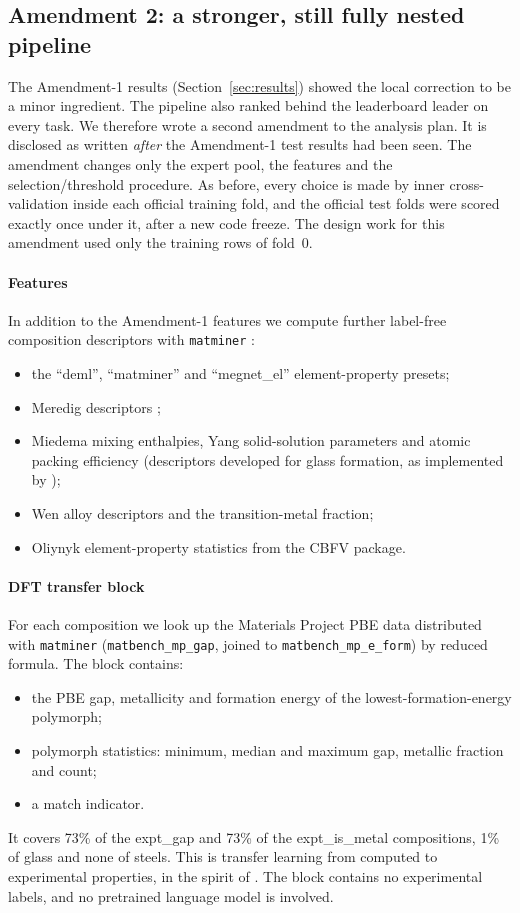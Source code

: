 \subsection{Amendment 2: a stronger, still fully nested pipeline}
\label{sec:a2}
The Amendment-1 results (Section~\ref{sec:results}) showed the local correction to be a minor ingredient. The pipeline also ranked behind the leaderboard leader on every task.
We therefore wrote a second amendment to the analysis plan. It is disclosed as written \emph{after} the Amendment-1 test results had been seen.
The amendment changes only the expert pool, the features and the selection/threshold procedure.
As before, every choice is made by inner cross-validation inside each official training fold, and the official test folds were scored exactly once under it, after a new code freeze.
The design work for this amendment used only the training rows of fold~0.

\paragraph{Features}
In addition to the Amendment-1 features we compute further label-free composition descriptors with \texttt{matminer} \citep{ward2018matminer}:
\begin{itemize}
\item the ``deml'', ``matminer'' and ``megnet\_el'' element-property presets;
\item Meredig descriptors \citep{meredig2014};
\item Miedema mixing enthalpies, Yang solid-solution parameters \citep{yang2012ss} and atomic packing efficiency \citep{laws2015ape} (descriptors developed for glass formation, as implemented by \citealp{ward2018bmg});
\item Wen alloy descriptors and the transition-metal fraction;
\item Oliynyk element-property statistics \citep{oliynyk2016} from the CBFV package.
\end{itemize}

\paragraph{DFT transfer block}
For each composition we look up the Materials Project \citep{jain2013mp} PBE data distributed with \texttt{matminer} (\texttt{matbench\_mp\_gap}, joined to \texttt{matbench\_mp\_e\_form}) by reduced formula.
The block contains:
\begin{itemize}
\item the PBE gap, metallicity and formation energy of the lowest-formation-energy polymorph;
\item polymorph statistics: minimum, median and maximum gap, metallic fraction and count;
\item a match indicator.
\end{itemize}
It covers 73\% of the expt\_gap and 73\% of the expt\_is\_metal compositions, 1\% of glass and none of steels.
This is transfer learning from computed to experimental properties, in the spirit of \citet{kauwe2020bandgap}. The block contains no experimental labels, and no pretrained language model is involved.

